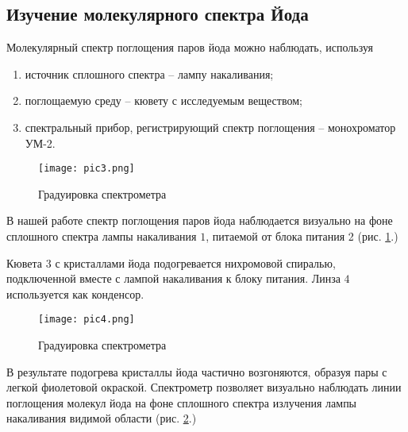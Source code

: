 \subsection{Изучение молекулярного спектра Йода}

Молекулярный спектр поглощения паров йода можно наблюдать, используя

\begin{enumerate}
  \item источник сплошного спектра -- лампу накаливания;
  \item поглощаемую среду -- кювету с исследуемым веществом;
  \item спектральный прибор, регистрирующий спектр поглощения -- монохроматор
  УМ-2.
\end{enumerate}

\begin{figure}[h!]
  \centering
  \texttt{[image: pic3.png]}
  \caption{Градуировка спектрометра}
  \label{pic3}
\end{figure}

В нашей работе спектр поглощения паров йода наблюдается визуально на фоне
сплошного спектра лампы накаливания $1$, питаемой от блока питания 2 (рис.
\ref{pic3}.)

Кювета $3$ с кристаллами йода подогревается нихромовой спиралью, подключенной
вместе с лампой накаливания к блоку питания. Линза $4$ используется как
конденсор.

\begin{figure}[h!]
  \centering
  \texttt{[image: pic4.png]}
  \caption{Градуировка спектрометра}
  \label{pic4}
\end{figure}

В результате подогрева кристаллы йода частично возгоняются, образуя пары с
легкой фиолетовой окраской. Спектрометр позволяет визуально наблюдать линии
поглощения молекул йода на фоне сплошного спектра излучения лампы накаливания
видимой области (рис. \ref{pic4}.)
